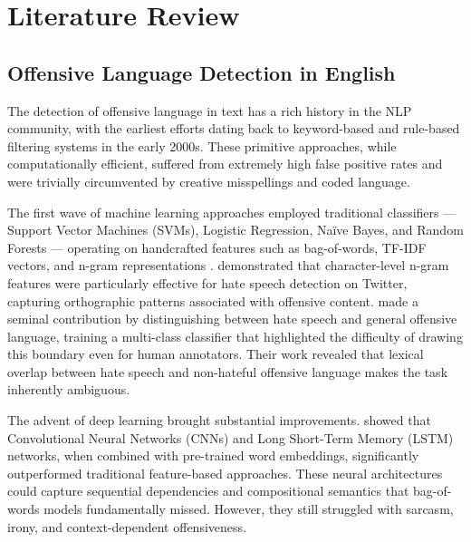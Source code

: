 \documentclass[12pt, a4paper]{article}
\begin{document}
\FloatBarrier

\section{Literature Review}
\label{sec:literature}

\subsection{Offensive Language Detection in English}

The detection of offensive language in text has a rich history in the NLP community, with the earliest efforts dating back to keyword-based and rule-based filtering systems in the early 2000s. These primitive approaches, while computationally efficient, suffered from extremely high false positive rates and were trivially circumvented by creative misspellings and coded language.

The first wave of machine learning approaches employed traditional classifiers --- Support Vector Machines (SVMs), Logistic Regression, Na\"ive Bayes, and Random Forests --- operating on handcrafted features such as bag-of-words, TF-IDF vectors, and n-gram representations \citep{waseem2016hateful}. \citet{waseem2016hateful} demonstrated that character-level n-gram features were particularly effective for hate speech detection on Twitter, capturing orthographic patterns associated with offensive content. \citet{davidson2017automated} made a seminal contribution by distinguishing between hate speech and general offensive language, training a multi-class classifier that highlighted the difficulty of drawing this boundary even for human annotators. Their work revealed that lexical overlap between hate speech and non-hateful offensive language makes the task inherently ambiguous.

The advent of deep learning brought substantial improvements. \citet{badjatiya2017deep} showed that Convolutional Neural Networks (CNNs) and Long Short-Term Memory (LSTM) networks, when combined with pre-trained word embeddings, significantly outperformed traditional feature-based approaches. These neural architectures could capture sequential dependencies and compositional semantics that bag-of-words models fundamentally missed. However, they still struggled with sarcasm, irony, and context-dependent offensiveness.
\end{document}
